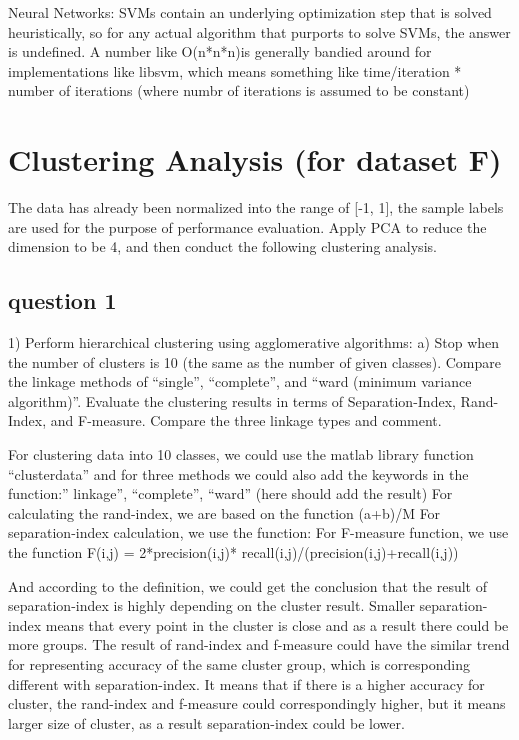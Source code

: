 \documentclass[]{article}
\begin{document}
Neural Networks:  SVMs contain an underlying optimization step that is solved heuristically, so for any actual algorithm that purports to solve SVMs, the answer is undefined. A number like
O(n*n*n)is generally bandied around for implementations like libsvm, which means something like time/iteration * number of iterations (where numbr of  iterations is assumed to be constant)



\section{Clustering Analysis (for dataset F)}
The data has already been normalized into the range of [-1, 1], the sample labels are used for the purpose of performance evaluation.
Apply PCA to reduce the dimension to be 4, and then conduct the following clustering analysis.
\subsection{question 1}
1) Perform hierarchical clustering using agglomerative algorithms:
a) Stop when the number of clusters is 10 (the same as the number of given classes). Compare the linkage methods of “single”, “complete”, and “ward (minimum variance algorithm)”. Evaluate the clustering results in terms of Separation-Index, Rand-Index, and F-measure. Compare the three linkage types and comment.


For clustering data into 10 classes, we could use the matlab library function “clusterdata” and for three methods we could also add the keywords in the function:” linkage”, “complete”, “ward”
(here should add the result)
For calculating the rand-index, we are based on the function (a+b)/M
For separation-index calculation, we use the function:   
For F-measure function, we use the function F(i,j) = 2*precision(i,j)* recall(i,j)/(precision(i,j)+recall(i,j))


And according to the definition, we could get the conclusion that the result of separation-index is highly depending on the cluster result. Smaller separation-index means that every point in the cluster is close and as a result there could be more groups.
The result of rand-index and f-measure could have the similar trend for representing accuracy of the same cluster group, which is corresponding different with separation-index. It means that if there is a higher accuracy for cluster, the rand-index and f-measure could correspondingly higher, but it means larger size of cluster, as a result separation-index could be lower.
\end{document}
